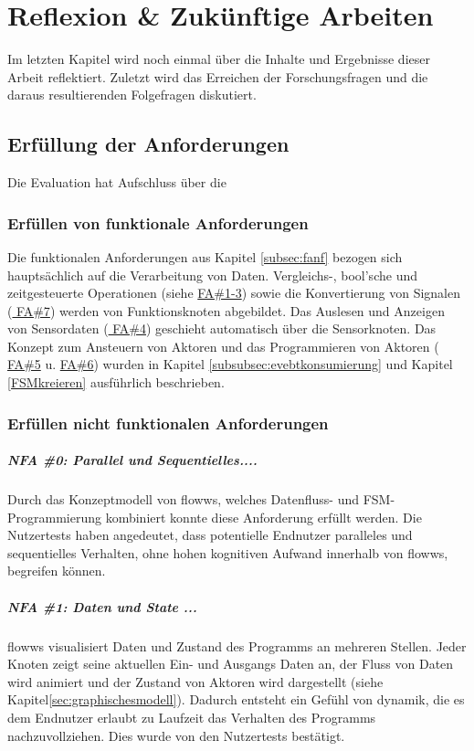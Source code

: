 \chapter{Reflexion \& Zukünftige Arbeiten}
Im letzten Kapitel wird noch einmal über die Inhalte und Ergebnisse dieser Arbeit reflektiert. Zuletzt wird das Erreichen der Forschungsfragen und die daraus resultierenden Folgefragen diskutiert.

\section{Erfüllung der Anforderungen}
Die Evaluation hat Aufschluss über die 

\subsection{Erfüllen von funktionale Anforderungen}
Die funktionalen Anforderungen aus Kapitel \ref{subsec:fanf} bezogen sich hauptsächlich auf die Verarbeitung von Daten. Vergleichs-, bool'sche und zeitgesteuerte Operationen (siehe \hyperref[tab:fanf]{FA\#1-3}) sowie die Konvertierung von Signalen (\hyperref[tab:fanf]{ FA\#7}) werden von Funktionsknoten abgebildet. Das Auslesen und Anzeigen von Sensordaten (\hyperref[tab:fanf]{ FA\#4}) geschieht automatisch über die Sensorknoten. Das Konzept zum Ansteuern von Aktoren und das Programmieren von Aktoren (\hyperref[tab:fanf]{ FA\#5} u. \hyperref[tab:fanf]{ FA\#6}) wurden in Kapitel \ref{subsubsec:evebtkonsumierung} und Kapitel \ref{FSMkreieren} ausführlich beschrieben.

\subsection{Erfüllen nicht funktionalen Anforderungen}
\paragraph{NFA \#0: Parallel und Sequentielles....} Durch das Konzeptmodell von flowws, welches Datenfluss- und \ac{FSM}-Programmierung kombiniert konnte diese Anforderung erfüllt werden. Die Nutzertests haben angedeutet, dass potentielle Endnutzer paralleles und sequentielles Verhalten, ohne hohen kognitiven Aufwand innerhalb von flowws, begreifen können.

\paragraph{NFA \#1: Daten und State ...} flowws visualisiert Daten und Zustand des Programms an mehreren Stellen. Jeder Knoten zeigt seine aktuellen Ein- und Ausgangs Daten an, der Fluss von Daten wird animiert und der Zustand von Aktoren wird dargestellt (siehe Kapitel\ref{sec:graphischesmodell}). Dadurch entsteht ein Gefühl von dynamik, die es dem Endnutzer erlaubt zu Laufzeit das Verhalten des Programms nachzuvollziehen. Dies wurde von den Nutzertests bestätigt.


